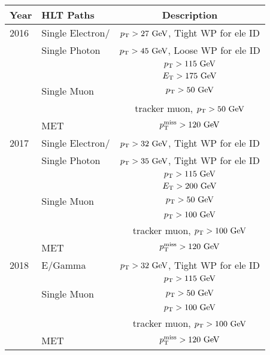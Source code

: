 \scriptsize
\begin{tabular}{l|l|c}
  \hline
  Year & HLT Paths & Description\\
  \hline
  \hline
  2016 & Single Electron/ & $\pt>27\unit{GeV}$, Tight WP for ele ID \\
  & Single Photon & $\pt>45\unit{GeV}$, Loose WP for ele ID \\
  && $\pt>115\unit{GeV}$ \\
  && $\Et>175\unit{GeV}$ \\
  \cline{2-3}
  & Single Muon & $\pt>50\unit{GeV}$ \\
  && tracker muon, $\pt>50\unit{GeV}$ \\
  \cline{2-3}
  & MET & $\ptmiss>120\unit{GeV}$ \\
  \hline
  2017 & Single Electron/& $\pt>32\unit{GeV}$, Tight WP for ele ID \\
  & Single Photon & $\pt>35\unit{GeV}$, Tight WP for ele ID \\
  && $\pt>115\unit{GeV}$ \\
  && $\Et>200\unit{GeV}$ \\
  \cline{2-3}
  & Single Muon & $\pt>50\unit{GeV}$ \\
  && $\pt>100\unit{GeV}$ \\
  && tracker muon, $\pt>100\unit{GeV}$ \\
  \cline{2-3}
  & MET & $\ptmiss>120\unit{GeV}$ \\
  \hline
  2018 & E/Gamma & $\pt>32\unit{GeV}$, Tight WP for ele ID \\
  && $\pt>115\unit{GeV}$ \\
  \cline{2-3}
  & Single Muon & $\pt>50\unit{GeV}$ \\
  && $\pt>100\unit{GeV}$ \\
  && tracker muon, $\pt>100\unit{GeV}$ \\
  \cline{2-3}
  & MET & $\ptmiss>120\unit{GeV}$ \\
  \hline
\end{tabular}
